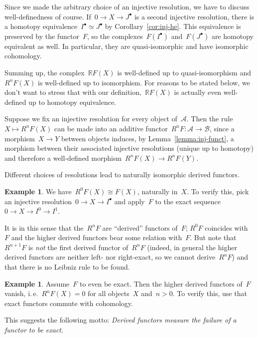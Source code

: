 \documentclass{amsart}
\makeatletter
\theoremstyle{definition}
\newtheorem{ex}[defn]{Example}
\theoremstyle{plain}
\theoremstyle{remark}
\newcommand{\A}{\mathcal{A}}
\newcommand{\B}{\mathcal{B}}
\newcommand{\RR}{\mathbb{R}}
\newcommand{\?}{\,{:}\,}
\renewcommand{\_}{\mathpunct{.}\,}
\newcommand{\ie}{i.\,e.\@\xspace}
\makeatother
\begin{document}
Since we made the arbitrary choice of an injective resolution, we have to
discuss well-definedness of course. If~$0 \to X \to J^\bullet$ is a second
injective resolution, there is a homotopy equivalence~$I^\bullet \simeq
J^\bullet$ by Corollary~\ref{cor:inj-he}. This equivalence is preserved by the
functor~$F$, so the complexes~$F(I^\bullet)$ and~$F(J^\bullet)$ are homotopy
equivalent as well. In particular, they are quasi-isomorphic and have
isomorphic cohomology.

Summing up, the complex~$\RR F(X)$ is well-defined up to quasi-isomorphism and~$R^n F(X)$
is well-defined up to isomorphism. For reasons to be stated below, we don't
want to stress that with our definition,~$\RR F(X)$ is actually even
well-defined up to homotopy equivalence.

Suppose we fix an injective resolution for every object of~$\A$. Then the rule~$X
\mapsto R^n F(X)$ can be made into an additive functor~$R^n F : \A \to \B$,
since a morphism~$X \to Y$ between objects induces, by Lemma~\ref{lemma:inj-funct}, a morphism between their
associated injective resolutions (unique up to homotopy) and
therefore a well-defined morphism~$R^n F(X) \to R^n F(Y)$.

Different choices of resolutions lead to naturally isomorphic derived
functors.

\begin{ex}We have~$R^0 F(X) \cong F(X)$, naturally in~$X$. To verify this, pick
an injective resolution~$0 \to X \to I^\bullet$ and apply~$F$ to
the exact sequence~$0 \to X \to I^0 \to I^1$.
\end{ex}

It is in this sense that the~$R^n F$ are ``derived'' functors of~$F$; $R^0 F$
coincides with~$F$ and the higher derived functors bear some relation with~$F$.
But note that~$R^{n+1} F$ is \emph{not} the first derived functor of~$R^n F$
(indeed, in general the higher derived functors are neither left- nor
right-exact, so we cannot derive~$R^n F$) and that there is no Leibniz rule to
be found.

\begin{ex}Assume~$F$ to even be exact. Then the higher derived functors of~$F$
vanish, \ie~$R^n F(X) = 0$ for all objects~$X$ and~$n > 0$. To verify this, use
that exact functors commute with cohomology.\end{ex}

This suggests the following motto: \emph{Derived functors measure the
failure of a functor to be exact.}
\end{document}

